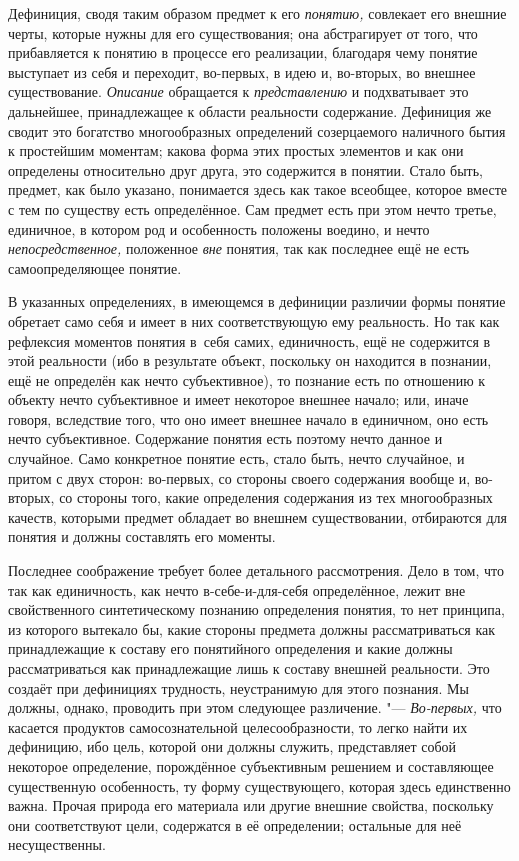 Дефиниция, сводя таким образом предмет к его
{\em понятию,} совлекает
его внешние черты, которые нужны для его существования; она абстрагирует от
того, что прибавляется к понятию в процессе его реализации, благодаря чему
понятие выступает из себя и переходит, во-первых, в идею и, во-вторых, во
внешнее существование. {\em Описание}
обращается к
{\em представлению} и
подхватывает это дальнейшее, принадлежащее к области реальности содержание.
Дефиниция же сводит это богатство многообразных определений созерцаемого
наличного бытия к простейшим моментам; какова форма этих простых элементов
и как они определены относительно друг друга, это содержится в понятии.
Стало быть, предмет, как было указано, понимается здесь как такое всеобщее,
которое вместе с тем по существу есть определённое. Сам предмет есть при
этом нечто третье, единичное, в котором род и особенность
положены воедино, и нечто
{\em непосредственное,}
положенное {\em вне}
понятия, так как последнее ещё не есть самоопределяющее
понятие.

В указанных определениях, в имеющемся в дефиниции различии
формы понятие обретает само себя и имеет в них соответствующую ему
реальность. Но так как рефлексия моментов понятия в~себя самих,
единичность, ещё не содержится в этой реальности (ибо в результате объект,
поскольку он находится в познании, ещё не определён как нечто
субъективное), то познание есть по отношению к объекту нечто субъективное и
имеет некоторое внешнее начало; или, иначе говоря, вследствие того, что оно
имеет внешнее начало в единичном, оно есть нечто субъективное. Содержание
понятия есть поэтому нечто данное и случайное. Само конкретное понятие
есть, стало быть, нечто случайное, и притом с двух сторон: во-первых, со
стороны своего содержания вообще и, во-вторых, со стороны того, какие
определения содержания из тех многообразных качеств, которыми предмет
обладает во внешнем существовании, отбираются для понятия и должны
составлять его моменты.

Последнее соображение требует более детального рассмотрения.
Дело в том, что так как единичность, как нечто
в-себе-и-для-себя определённое, лежит вне свойственного
синтетическому познанию определения понятия, то нет принципа, из которого
вытекало бы, какие стороны предмета должны рассматриваться как
принадлежащие к составу его понятийного определения и какие должны
рассматриваться как принадлежащие лишь к составу внешней реальности. Это
создаёт при дефинициях трудность, неустранимую для этого познания. Мы
должны, однако, проводить при этом следующее различение. "---
{\em Во-первых,} что
касается продуктов самосознательной целесообразности, то легко найти их
дефиницию, ибо цель, которой они должны служить, представляет собой
некоторое определение, порождённое субъективным решением и составляющее
существенную особенность, ту форму существующего, которая здесь единственно
важна. Прочая природа его материала или другие внешние свойства, поскольку
они соответствуют цели, содержатся в её определении; остальные для неё
несущественны.

